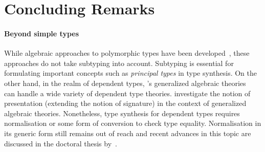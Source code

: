 
\section{Concluding Remarks} \label{sec:future}



\paragraph{Beyond simple types}
While algebraic approaches to polymorphic types have been developed~\citep{Fiore2013,Hamana2011}, these approaches do not take subtyping into account.
Subtyping is essential for formulating important concepts such as \emph{principal types} in type synthesis.
On the other hand, in the realm of dependent types, \citeauthor{Cartmell1986}'s generalized algebraic theories~\citeyearpar{Cartmell1986} can handle a wide variety of dependent type theories.
\citet{Bezem2021} investigate the notion of presentation (extending the notion of signature) in the context of generalized algebraic theories.
Nonetheless, type synthesis for dependent types requires normalisation or some form of conversion to check type equality.
Normalisation in its generic form still remains out of reach and recent advances in this topic are discussed in the doctoral thesis by~\citet{Valliappan2023}.
